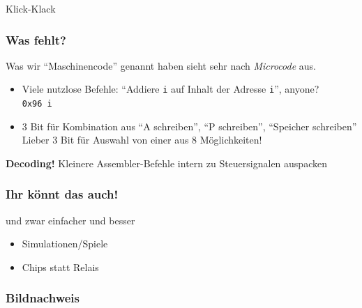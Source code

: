 \documentclass[t,aspectratio=169,usenames,dvipsnames]{beamer}
\begin{document}
\begin{frame}[c]
  \begin{center}
    \Huge{Klick-Klack}
  \end{center}
\end{frame}

\begin{frame}
  \frametitle{Was fehlt?}

  Was wir \enquote{Maschinencode} genannt haben sieht sehr nach \emph{Microcode} aus.
  \begin{itemize}
  \item Viele nutzlose Befehle: \enquote{Addiere \texttt{i} auf Inhalt der Adresse \texttt{i}}, anyone?\\
    \texttt{0x96 i}
  \item 3 Bit für Kombination aus \enquote{A schreiben}, \enquote{P schreiben}, \enquote{Speicher schreiben}\\
    Lieber 3 Bit für Auswahl von einer aus 8 Möglichkeiten!

  \end{itemize}

  \bigskip\pause

  \textbf{Decoding!} Kleinere Assembler-Befehle intern zu Steuersignalen auspacken
\end{frame}

\begin{frame}
  \frametitle{Ihr könnt das auch!}

  und zwar einfacher und besser
  \begin{itemize}
  \item Simulationen/Spiele
  \item Chips statt Relais
  \end{itemize}
\end{frame}

\begin{frame}
  \frametitle{Bildnachweis}
  \tiny
  \begin{description}
  \end{description}
\end{frame}
\end{document}

